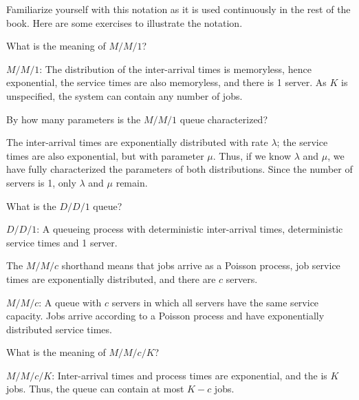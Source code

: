 Familiarize yourself with this notation as it is used continuously in the rest of the book. Here are some exercises to illustrate the notation.

\begin{extra}
 What is the meaning of $M/M/1$?
\begin{solution}
$M/M/1$: The distribution of the inter-arrival times is
 memoryless, hence exponential, the service times are also
 memoryless, and there is 1 server. As $K$ is unspecified, the system can contain any number of jobs.
\end{solution}
\end{extra}

\begin{extra}
 By how many parameters is the $M/M/1$ queue characterized?
\begin{solution}
 The inter-arrival times are exponentially distributed with rate $\lambda$; the service times are also exponential, but with parameter $\mu$. Thus, if we know $\lambda$ and $\mu$, we have fully characterized the parameters of both distributions. Since the number of servers is 1, only $\lambda$ and $\mu$ remain.
\end{solution}
\end{extra}

\begin{extra}
What is the $D/D/1$ queue? 
\begin{solution}
$D/D/1$: A queueing process with deterministic inter-arrival times, deterministic service times and 1 server.
\end{solution}
\end{extra}

\begin{extra}
The $M/M/c$ shorthand means that jobs arrive as a Poisson process, job service times are exponentially distributed, and there are $c$ servers.
\begin{solution}
$M/M/c$: A  queue with $c$ servers in which
 all servers have the same service capacity. Jobs arrive according to a
 Poisson process and have exponentially distributed service times.
\end{solution}
\end{extra}

\begin{extra}
 What is the meaning of $M/M/c/K$?
\begin{solution}
$M/M/c/K$: Inter-arrival times and process times are exponential,
 and the  is $K$ jobs. Thus, the queue can
 contain at most $K-c$ jobs. 

\end{solution}
\end{extra}


